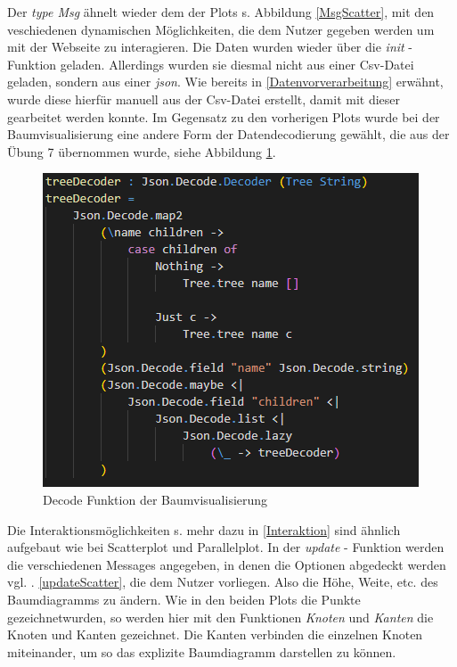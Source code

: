 \documentclass[usegeometry=true]{scrartcl}
\begin{document}
\noindent Der \textit{type Msg} ähnelt wieder dem der Plots s. Abbildung \ref{MsgScatter}, mit den veschiedenen dynamischen Möglichkeiten, die dem Nutzer gegeben werden um mit der Webseite zu interagieren. Die Daten wurden wieder über die \textit{init} - Funktion geladen. Allerdings wurden sie diesmal nicht aus einer Csv-Datei geladen, sondern aus einer \textit{json}. Wie bereits in \ref{Datenvorverarbeitung} erwähnt, wurde diese hierfür manuell aus der Csv-Datei erstellt, damit mit dieser gearbeitet werden konnte. Im Gegensatz zu den vorherigen Plots wurde bei der Baumvisualisierung eine andere Form der Datendecodierung gewählt, die aus der Übung 7 übernommen wurde, siehe Abbildung \ref{treeDecode}.


\begin{figure}[h]
\begin{center}
	\includegraphics[scale=.75]{treeDecode.png}
	\caption{Decode Funktion der Baumvisualisierung}
	\label{treeDecode}
\end{center}
\end{figure}


\noindent Die Interaktionsmöglichkeiten s. mehr dazu in \ref{Interaktion} sind ähnlich aufgebaut wie bei Scatterplot und Parallelplot. In der \textit{update} - Funktion werden die verschiedenen Messages angegeben, in denen die Optionen abgedeckt werden vgl. . \ref{updateScatter}, die dem Nutzer vorliegen. Also die Höhe, Weite, etc. des Baumdiagramms zu ändern. Wie in den beiden Plots die Punkte \glqq gezeichnet\grqq wurden, so werden hier mit den Funktionen \textit{Knoten} und \textit{Kanten} die Knoten und Kanten \glqq gezeichnet\grqq . Die Kanten verbinden die einzelnen Knoten miteinander, um so das explizite Baumdiagramm darstellen zu können.\\
\end{document}
